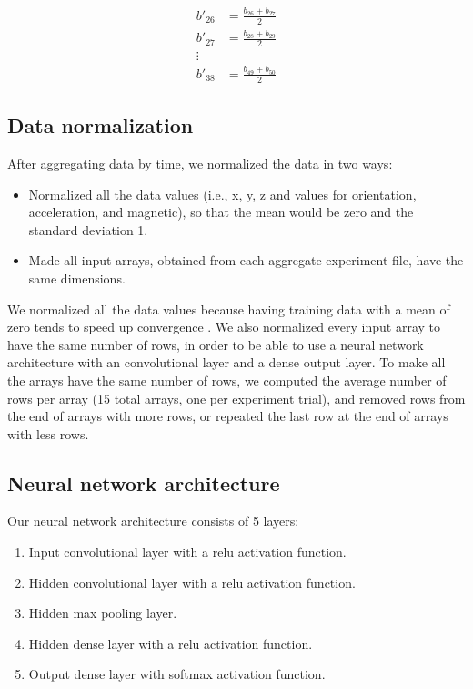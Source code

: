 \documentclass[journal]{IEEEtranTIE}
\begin{document}
\begin{align}
    b'_{26} &= \frac{b_{26} + b_{27}}{2} \\
    b'_{27} &= \frac{b_{28} + b_{29}}{2} \\
    \vdots \\
    b'_{38} &= \frac{b_{49} + b_{50}}{2}
\end{align}

\subsection{Data normalization}

After aggregating data by time, we normalized the data in two ways:

\begin{itemize}
\item Normalized all the data values (i.e., x, y, z and values for orientation,
      acceleration, and magnetic), so that the mean would be zero and the
      standard deviation 1.
\item Made all input arrays, obtained from each aggregate experiment file, have
      the same dimensions.
\end{itemize}

We normalized all the data values because having training data with a mean of
zero tends to speed up convergence \cite{DLTricks}. We also normalized every
input array to have the same number of rows, in order to be able to use a neural
network architecture with an convolutional layer and a dense output layer. To
make all the arrays have the same number of rows, we computed the average number
of rows per array (15 total arrays, one per experiment trial), and removed rows
from the end of arrays with more rows, or repeated the last row at the end of
arrays with less rows.

\subsection{Neural network architecture}

Our neural network architecture consists of 5 layers:

\begin{enumerate}
\item Input convolutional layer with a relu activation function.
\item Hidden convolutional layer with a relu activation function.
\item Hidden max pooling layer.
\item Hidden dense layer with a relu activation function.
\item Output dense layer with softmax activation function.
\end{enumerate}
\end{document}
